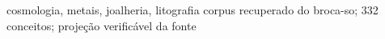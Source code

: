 \documentclass[11pt,a4paper]{article}
\begin{document}
       {cosmologia, metais, joalheria, litografia}
       {corpus recuperado do broca-so; 332 conceitos; projeção verificável da fonte}
\maketitle

\end{document}
